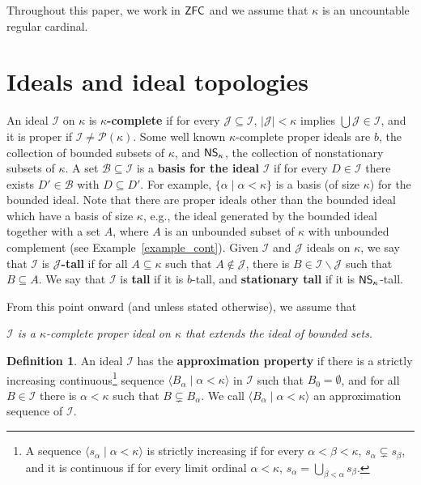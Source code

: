 \documentclass{amsart}
\numberwithin{equation}{section}
\newcommand{\I}{\mathcal{I}}
\newcommand{\J}{\mathcal{J}}
\newcommand{\seq}[2]{\langle #1 \mid #2 \rangle}
\newcommand{\markdef}[1]{\textbf{#1}}
\newcommand{\1}{\mathbf{I}}
\newcommand{\2}{\mathbf{II}}
\renewcommand{\a}{\alpha}
\renewcommand{\b}{\beta}
\renewcommand{\k}{\kappa}
\newcommand{\pow}{\mathscr{P}}
\newcommand{\ZFC}{{\sf ZFC}}
\theoremstyle{definition}
\newtheorem{definition}[theorem]{Definition}
\theoremstyle{remark}
\begin{document}
Throughout this paper, we work in \(\ZFC\) and we assume that \(\k\) is an uncountable regular cardinal. 




\section{Ideals and ideal topologies}\label{sec:ideal}


An ideal \(\I\) on $\k$ is \markdef{\(\k\)-complete} 
if  for every \(\J \subseteq \I\), \(|\J|<\k\) implies \(\bigcup \J \in \I\), and it is proper if \(\I \neq \pow(\k)\).
Some well known \(\k\)-complete proper ideals are \(b\), the collection of bounded subsets of \(\k\),  and \(\sf{NS_\k}\), the collection of nonstationary subsets of \(\k\).
A set \(\mathcal B \subseteq \I \) is a \markdef{basis for the ideal} \(\I\) if for every \(D \in \I\) there exists \( D' \in \mathcal B\) with \(D \subseteq D'\). For example, \(\{\a \mid \a<\k \}\) is a basis (of size $\k$) for the bounded ideal. Note that there are proper ideals other than the bounded ideal which have a basis of size $\k$, e.g., the ideal generated by the bounded ideal together with a set $A$, where $A$ is an unbounded subset of $\kappa$ with unbounded complement (see Example~\ref{example_cont}). %
Given $\mathcal{I}$ and $\mathcal{J}$ ideals on $\kappa$, we say that $\mathcal{I}$ is \markdef{$\mathcal{J}$-tall} if for all $A\subseteq \kappa$ such that $A\notin\mathcal{J}$, there is $B\in\mathcal{I}\backslash \mathcal{J}$ such that $B\subseteq A$. We say that $\mathcal{I}$ is \markdef{tall} if it is \(b\)-tall, and \markdef{stationary tall} if it is \(\sf{NS_\k}\)-tall.



From this point onward (and
unless stated otherwise), we assume that
\begin{center}
\emph{ $\I$ is a ${}\kappa$-complete proper ideal on $\kappa$ that extends the ideal of bounded sets.}
\end{center}


\begin{definition}\label{approx_property_for_last}
    An ideal $\mathcal{I}$ has the \markdef{approximation property} if there is a strictly increasing continuous{}\footnote{A sequence \(\seq{s_\a}{\a<\k}\) is %
strictly increasing if for every \(\a<\b<\k\), \(s_\a \subsetneq s_\b\), and it is continuous if for every limit ordinal \(\a<\k\), \(s_\a=\bigcup_{\b<\a}s_\b\).} sequence $\seq{ B_\alpha}{\alpha<\kappa}$ in $\mathcal{I}$ %
    such that $B_0=\emptyset$, and for all $B\in \mathcal{I}$ there is $\alpha<\kappa$ such that $B\subsetneq B_\alpha$. We call $\seq{B_\alpha}{\alpha<\kappa}$ an approximation sequence of $\mathcal{I}$.
\end{definition}
\end{document}
